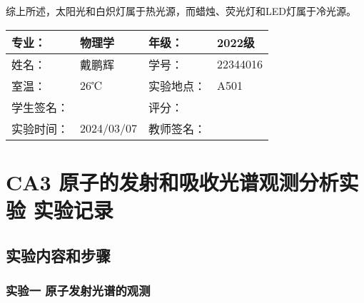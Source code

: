 \documentclass[dvipsnames, svgnames,a4paper,11pt]{article}
\begin{document}
	综上所述，太阳光和白炽灯属于热光源，而蜡烛、荧光灯和LED灯属于冷光源。

	

\clearpage
\begin{table}
	\renewcommand\arraystretch{1.7}
	\centering
	\begin{tabularx}{\textwidth}{|X|X|X|X|}
	\hline
	专业：& 物理学 &年级：& 2022级 \\
	\hline
	姓名：& 戴鹏辉 & 学号：& 22344016 \\
	\hline
	室温：& 26℃ & 实验地点： & A501 \\
	\hline
	学生签名：& & 评分： &\\
	\hline
	实验时间：& 2024/03/07 & 教师签名：&\\
	\hline
	\end{tabularx}
\end{table}

\section{CA3 \quad 原子的发射和吸收光谱观测分析实验 \quad\heiti 实验记录}
\subsection{实验内容和步骤}

	\subsubsection{实验一 \quad 原子发射光谱的观测}
		
\end{document}
